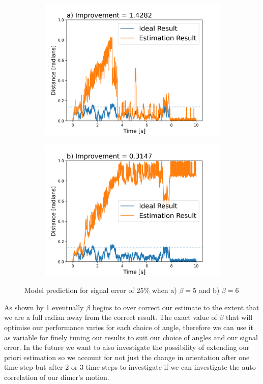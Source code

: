 \documentclass[final, 3p]{elsarticle}
\begin{document}
\begin{figure}[h]
	\centering
	\begin{subfigure}{0.3\textwidth}
		\includegraphics[width=\textwidth]{./Images/beta_5.png}
	\end{subfigure}
	\begin{subfigure}{0.3\textwidth}
		\includegraphics[width=\textwidth]{./Images/beta_6.png}
	\end{subfigure}
	\caption{Model prediction for signal error of $25\%$ when a) $\beta = 5$ and b) $\beta=6$}
	\label{fig:beta}
\end{figure}

As shown by \ref{fig:beta} eventually $\beta$ begins to over correct our estimate to the extent that we are a full radian away from the correct result. The exact value of $\beta$ that will optimise our performance varies for each choice of angle, therefore we can use it as variable for finely tuning our results to suit our choice of angles and our signal error. In the future we want to also investigate the possibility of extending our priori estimation so we account for not just the change in orientation after one time step but after 2 or 3 time steps to investigate if we can investigate the auto correlation of our dimer's motion.
\end{document}
